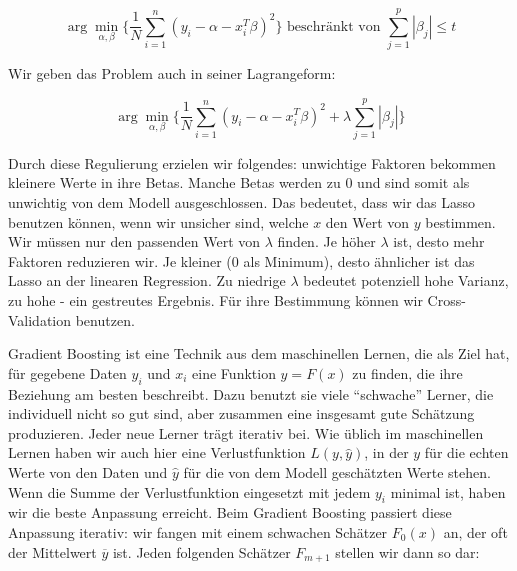 \documentclass[12pt,a4paper,twoside]{scrartcl}
\numberwithin{equation}{section}
\newcounter{subsubsubsection}[subsubsection]
\begin{document}
\begin{equation}\label{eq:2.23}
	\arg\min_{\alpha, \beta} \bigg\{ \frac{1}{N}\sum_{i=1}^{n} (y_i - \alpha - x_i^T\beta)^2 \bigg\} \text{ beschränkt von } \sum_{j=1}^{p} |\beta_j| \leq t
\end{equation}  

\noindent
Wir geben das Problem auch in seiner Lagrangeform:\par 

\begin{equation}\label{eq:2.24}
	 \arg\min_{\alpha, \beta} \bigg\{ \frac{1}{N}\sum_{i=1}^{n} (y_i - \alpha - x_i^T\beta)^2 + \lambda  \sum_{j=1}^{p} |\beta_j| \bigg\}
\end{equation} 

\noindent
Durch diese Regulierung erzielen wir folgendes: unwichtige Faktoren bekommen kleinere Werte in ihre Betas. Manche Betas werden zu $0$ und sind somit als unwichtig von dem Modell ausgeschlossen. Das bedeutet, dass wir das Lasso benutzen können, wenn wir unsicher sind, welche $x$ den Wert von $y$ bestimmen\cite{tibshirani1996regression}. Wir müssen nur den passenden Wert von $\lambda$ finden. Je höher $\lambda$ ist, desto mehr Faktoren reduzieren wir. Je kleiner ($0$ als Minimum), desto ähnlicher ist das Lasso an der linearen Regression.  Zu niedrige $\lambda$ bedeutet potenziell hohe Varianz, zu hohe - ein gestreutes Ergebnis. Für ihre Bestimmung können wir Cross-Validation benutzen\cite{tibshirani1996regression}.\par 

\label{subsubsubsec:gradientBoosting}

Gradient Boosting ist eine Technik aus dem maschinellen Lernen, die als Ziel hat, für gegebene Daten $y_i$ und $x_i$ eine Funktion $y=F(x)$ zu finden, die ihre Beziehung am besten beschreibt. Dazu benutzt sie viele \enquote{schwache} Lerner, die individuell nicht so gut sind, aber zusammen eine insgesamt gute Schätzung produzieren. Jeder neue Lerner trägt iterativ bei. Wie üblich im maschinellen Lernen haben wir auch hier eine Verlustfunktion $L(y,\hat y)$, in der $y$ für die echten Werte von den Daten und $\hat y$ für die von dem Modell geschätzten Werte stehen. Wenn die Summe der Verlustfunktion eingesetzt mit jedem $y_i$ minimal ist, haben wir die beste Anpassung erreicht. Beim Gradient Boosting passiert diese Anpassung iterativ: wir fangen mit einem schwachen Schätzer $F_0(x)$ an, der oft der Mittelwert $\overline{y}$ ist\cite{gradientBoost}. Jeden folgenden Schätzer $F_{m+1}$ stellen wir dann so dar:\par
\end{document}
